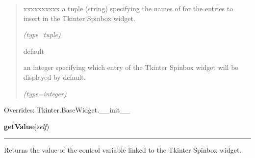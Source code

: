 \begin{boxedminipage}{\funcwidth}
\begin{quote}
\begin{Ventry}{xxxxxxxxxx}
          a tuple (string) specifying the names of for the entries to 
          insert in the Tkinter Spinbox widget.

            {\it (type=tuple)}

          \item[default]

          an integer specifying which entry of the Tkinter Spinbox widget 
          will be displayed by default.

            {\it (type=integer)}

        \end{Ventry}

      \end{quote}

      Overrides: Tkinter.BaseWidget.\_\_init\_\_

    \end{boxedminipage}

    \label{nMOLDYN:GUI:Widgets:ComboSpinbox:getValue}

    \vspace{0.5ex}

\hspace{.8\funcindent}\begin{boxedminipage}{\funcwidth}

    \raggedright \textbf{getValue}(\textit{self})

    \vspace{-1.5ex}

    \rule{\textwidth}{0.5\fboxrule}
\setlength{\parskip}{2ex}
    Returns the value of the control variable linked to the Tkinter Spinbox
    widget.

\setlength{\parskip}{1ex}
    \end{boxedminipage}

    \label{nMOLDYN:GUI:Widgets:ComboSpinbox:setValue}

    \vspace{0.5ex}


